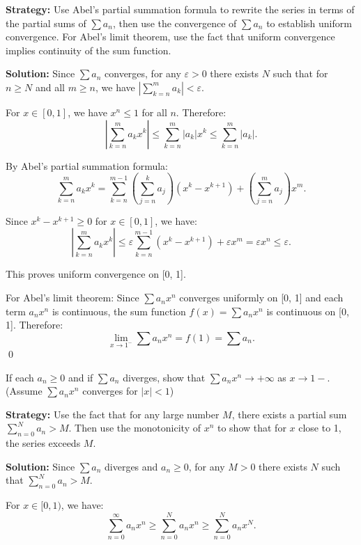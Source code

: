 \noindent\textbf{Strategy:} Use Abel's partial summation formula to rewrite the series in terms of the partial sums of \( \sum a_n \), then use the convergence of \( \sum a_n \) to establish uniform convergence. For Abel's limit theorem, use the fact that uniform convergence implies continuity of the sum function.

\bigskip\noindent\textbf{Solution:} Since \( \sum a_n \) converges, for any \( \varepsilon > 0 \) there exists \( N \) such that for \( n \geq N \) and all \( m \geq n \), we have \( |\sum_{k=n}^m a_k| < \varepsilon \).

For \( x \in [0, 1] \), we have \( x^n \leq 1 \) for all \( n \). Therefore:
\[\left|\sum_{k=n}^m a_k x^k\right| \leq \sum_{k=n}^m |a_k| x^k \leq \sum_{k=n}^m |a_k|.\]

By Abel's partial summation formula:
\[\sum_{k=n}^m a_k x^k = \sum_{k=n}^{m-1} \left(\sum_{j=n}^k a_j\right)(x^k - x^{k+1}) + \left(\sum_{j=n}^m a_j\right)x^m.\]

Since \( x^k - x^{k+1} \geq 0 \) for \( x \in [0, 1] \), we have:
\[\left|\sum_{k=n}^m a_k x^k\right| \leq \varepsilon \sum_{k=n}^{m-1} (x^k - x^{k+1}) + \varepsilon x^m = \varepsilon x^n \leq \varepsilon.\]

This proves uniform convergence on [0, 1].

For Abel's limit theorem: Since \( \sum a_n x^n \) converges uniformly on [0, 1] and each term \( a_n x^n \) is continuous, the sum function \( f(x) = \sum a_n x^n \) is continuous on [0, 1]. Therefore:
\[\lim_{x \to 1^-} \sum a_n x^n = f(1) = \sum a_n.\]\qed


\begin{problembox}
If each \( a_n \geq 0 \) and if \( \sum a_n \) diverges, show that \( \sum a_n x^n \to + \infty \) as \( x \to 1- \). (Assume \( \sum a_n x^n \) converges for \( |x| < 1 \))
\end{problembox}

\noindent\textbf{Strategy:} Use the fact that for any large number \( M \), there exists a partial sum \( \sum_{n=0}^N a_n > M \). Then use the monotonicity of \( x^n \) to show that for \( x \) close to 1, the series exceeds \( M \).

\bigskip\noindent\textbf{Solution:} Since \( \sum a_n \) diverges and \( a_n \geq 0 \), for any \( M > 0 \) there exists \( N \) such that \( \sum_{n=0}^N a_n > M \).

For \( x \in [0, 1) \), we have:
\[\sum_{n=0}^{\infty} a_n x^n \geq \sum_{n=0}^N a_n x^n \geq \sum_{n=0}^N a_n x^N.\]

